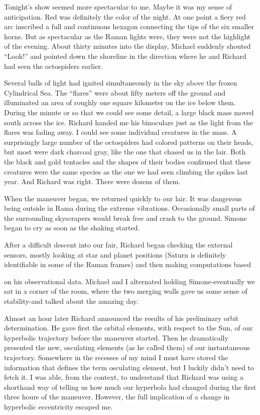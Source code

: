 \documentclass[]{article}
\begin{document}
Tonight’s show seemed more spectacular to me. Maybe it was my sense of anticipation. Red was definitely the color of the night. At one point a fiery red arc inscribed a full and continuous hexagon connecting the tips of the six smaller horns. But as spectacular as the Raman lights were, they were not the highlight of the evening. About thirty minutes into the display, Michael suddenly shouted “Look!” and pointed down the shoreline in the direction where he and Richard had seen the octospiders earlier.

Several balls of light had ignited simultaneously in the sky above the frozen Cylindrical Sea. The “flares” were about fifty meters off the ground and illuminated an area of roughly one square kilometer on the ice below them. During the minute or so that we could see some detail, a large black mass moved south across the ice. Richard handed me his binoculars just as the light from the flares was fading away. I could see some individual creatures in the mass. A surprisingly large number of the octospiders had colored patterns on their heads, but most were dark charcoal gray, like the one that chased us in the lair. Both the black and gold tentacles and the shapes of their bodies confirmed that these creatures were the same species as the one we had seen climbing the spikes last year. And Richard was right. There were dozens of them.

When the maneuver began, we returned quickly to our lair. It was dangerous being outside in Rama during the extreme vibrations. Occasionally small parts of the surrounding skyscrapers would break free and crash to the ground. Simone began to cry as soon as the shaking started.

After a difficult descent into our fair, Richard began checking the external sensors, mostly looking at star and planet positions (Saturn is definitely identifiable in some of the Raman frames) and then making computations based

on his observational data. Michael and I alternated holding Simone-eventually we sat in a corner of the room, where the two merging walls gave us some sense of stability-and talked about the amazing day.

Almost an hour later Richard announced the results of his preliminary orbit determination. He gave first the orbital elements, with respect to the Sun, of our hyperbolic trajectory before the maneuver started. Then he dramatically presented the new, osculating elements (as he called them) of our instantaneous trajectory. Somewhere in the recesses of my mind I must have stored the information that defines the term osculating element, but I luckily didn’t need to fetch it. I was able, from the context, to understand that Richard was using a shorthand way of telling us how much our hyperbola had changed during the first three hours of the maneuver. However, the full implication of a change in hyperbolic eccentricity escaped me.
\end{document}
